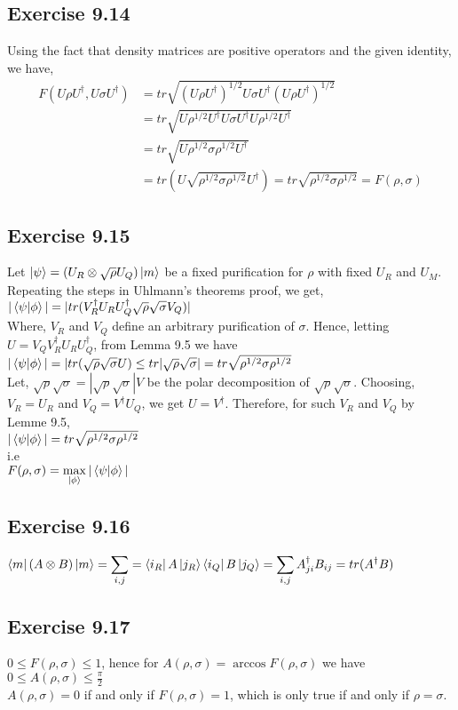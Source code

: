 \documentclass[a4paper,12pt]{article}
\begin{document}
\subsection*{Exercise 9.14}
Using the fact that density matrices are positive operators and the given identity, we have,
\begin{align*}
    F(U\rho U^\dagger, U\sigma U^\dagger)&=
    tr\sqrt{(U\rho U^\dagger)^{1/2}U\sigma U^\dagger(U\rho U^\dagger)^{1/2}}\\&=
    tr\sqrt{U\rho^{1/2} U^\dagger U\sigma U^\dagger U\rho^{1/2} U^\dagger}\\&=
    tr\sqrt{U\rho^{1/2} \sigma \rho^{1/2} U^\dagger}\\&=
    tr(U\sqrt{\rho^{1/2} \sigma \rho^{1/2}}U^\dagger)=tr\sqrt{\rho^{1/2} \sigma \rho^{1/2}}=
    F(\rho, \sigma)
\end{align*}
\subsection*{Exercise 9.15}
Let $\ket{\psi}=(U_R\otimes\sqrt{\rho}U_Q)\ket{m}$ be a 
fixed purification for $\rho$ with fixed $U_R$ and $U_M$. Repeating the steps
in Uhlmann's theorems proof, we get,\\
$|\braket{\psi|\phi}|=|tr(V_R^\dagger U_RU_Q^\dagger \sqrt{\rho}\sqrt{\sigma}V_Q)|$\\
Where, $V_R$ and $V_Q$ define an arbitrary purification of $\sigma$. Hence, letting
$U=V_QV_R^\dagger U_RU_Q^\dagger$, from Lemma 9.5 we have\\
$|\braket{\psi|\phi}|=|tr(\sqrt{\rho}\sqrt{\sigma}U)\leq tr|\sqrt{\rho}\sqrt{\sigma}|=
tr\sqrt{\rho^{1/2}\sigma\rho^{1/2}}$\\
Let, $\sqrt{\rho}\sqrt{\sigma}=|\sqrt{\rho}\sqrt{\sigma}|V$ be the polar decomposition of
$\sqrt{\rho}\sqrt{\sigma}$. Choosing, $V_R=U_R$ and $V_Q=V^\dagger U_Q$, we get $U=V^\dagger$.
Therefore, for such $V_R$ and $V_Q$ by Lemme 9.5,\\
$|\braket{\psi|\phi}|=tr\sqrt{\rho^{1/2}\sigma\rho^{1/2}}$\\
i.e\\
$F(\rho, \sigma)=\displaystyle\max_{\ket{\phi}}|\braket{\psi|\phi}|$
\subsection*{Exercise 9.16}
$\bra{m}(A\otimes B)\ket{m}=\displaystyle \sum_{i,j}=
\bra{i_R}A\ket{j_R}\bra{i_Q}B\ket{j_Q}=\sum_{i,j}A^\dagger_{ji}B_{ij}=tr(A^\dagger B)$
\subsection*{Exercise 9.17}
$0\leq F(\rho, \sigma)\leq 1$, hence for $A(\rho, \sigma)=\arccos F(\rho, \sigma)$ we have
$0\leq A(\rho, \sigma)\leq \frac{\pi}{2}$\\
$A(\rho, \sigma)=0$ if and only if $F(\rho, \sigma)=1$, which is only true if and only if
$\rho=\sigma$.
\end{document}
